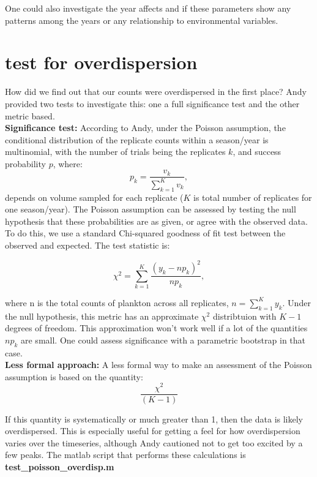 \documentclass[11pt]{article}
\begin{document}
One could also investigate the year affects and if these parameters show any patterns among the years or any relationship to environmental variables. 
\clearpage

\section{test for overdispersion}        

How did we find out that our counts were overdispersed in the first place? Andy provided two tests to investigate this: one a full significance test and the other metric based.\\

\noindent \textbf{Significance test:} According to Andy, under the Poisson assumption, the conditional distribution of the replicate counts within a season/year is multinomial, with the number of trials being the replicates $k$, and success probability $p$, where:
\[
p_k = \frac{v_k}{\sum_{k=1}^K v_k},
\]
depends on volume sampled for each replicate ($K$ is total number of replicates for one season/year). The Poisson assumption can be assessed by testing the null hypothesis that these probabilities are as given, or agree with the observed data. To do this, we use a standard Chi-squared goodness of fit test between the observed and expected. The test statistic is:

\[
\chi^2 = \sum_{k=1}^K \frac{(y_k-np_k)^2}{np_k},
\]

\noindent where n is the total counts of plankton across all replicates, $n= \sum_{k=1}^K y_k$. Under the null hypothesis, this metric has an approximate $\chi^2$ distribtuion with $K-1$ degrees of freedom. This approximation won't work well if a lot of the quantities $np_k$ are small. One could assess significance with a parametric bootstrap in that case.\\
                                               
\noindent \textbf{Less formal approach:} A less formal way to make an assessment of the Poisson assumption is based on the quantity:
\[
\frac{\chi^2}{(K-1)}
\]

\noindent If this quantity is systematically or much greater than 1, then the data is likely overdispersed. This is especially useful for getting a feel for how overdispersion varies over the timeseries, although Andy cautioned not to get too excited by a few peaks. The matlab script that performs these calculations is \textbf{test\_poisson\_overdisp.m}
\end{document}

